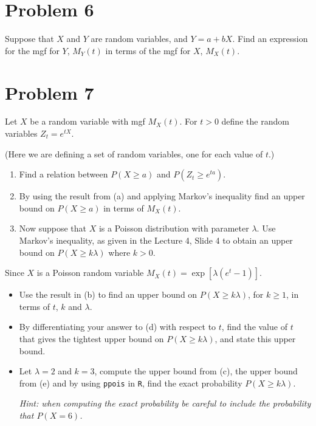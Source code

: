 \documentclass{article}
\newcommand{\1}{\mathbf{1}}
\begin{document}
\newpage
\section*{Problem 6}
Suppose that $X$ and $Y$ are random variables, and $Y = a + bX$.  
Find an expression for the mgf for $Y$, $M_Y(t)$ in terms of the mgf for $X$, $M_X(t)$.



\newpage
\section*{Problem 7}
Let $X$ be a random variable with mgf $M_X(t)$. For $t >0$ define the random variables $Z_t = e^{tX}$.\par 
(Here we are defining a set of random variables, one for each value of $t$.)
\begin{enumerate}
    \item Find a relation between $P(X \geq a)$ and $P(Z_t \geq e^{ta})$. 
    \item By using the result from (a) and applying Markov's inequality find an upper bound on {\color{blue} $P(X \geq a)$} in terms of $M_X(t)$. 
    \item Now suppose that $X$ is a Poisson distribution with parameter  $\lambda$. Use Markov's inequality, as given in the Lecture 4, Slide 4 to obtain an upper bound on $P(X \geq k\lambda)$ where $k> 0$.
\end{enumerate}
Since $X$ is a Poisson random variable $M_X(t) = \exp\left[\lambda(e^t - 1)\right]$. 
\begin{itemize}
    \item[(d)] Use the result in (b) to find an upper bound on $P(X \geq k\lambda)$, for $k\geq 1$, in terms of $t$, $k$ and $\lambda$.
    \item[(e)] By differentiating your answer to {\color{blue}(d)} with respect to $t$, find the value of $t$ that gives the tightest upper bound on $P(X \geq k\lambda)$, and state this upper bound.
    \item[(f)] Let $\lambda=2$ and $k=3$, compute the upper bound from (c), the upper bound from (e) and by using {\tt ppois} in {\tt R}, find the exact probability $P(X \geq k\lambda)$.\par
    {\it Hint: when computing the exact probability be careful to include the probability that $P(X=6)$.}
\end{itemize}
\end{document}
